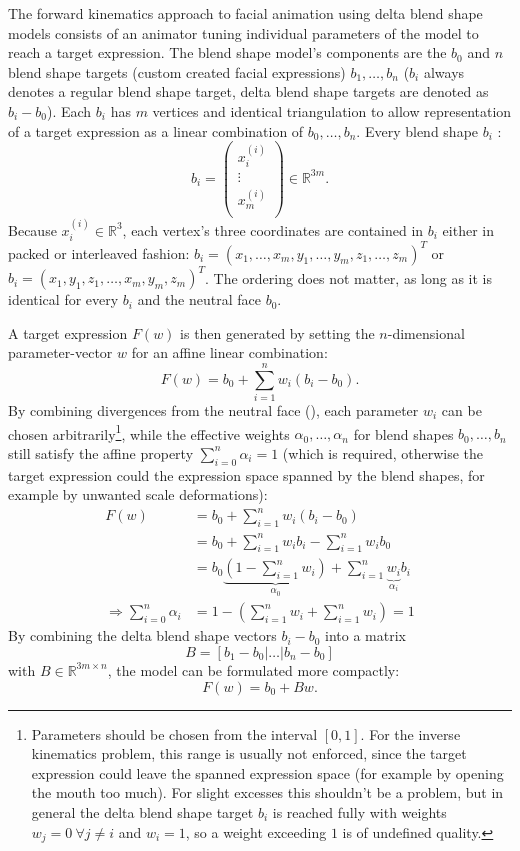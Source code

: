 The forward kinematics approach to facial animation using delta blend shape models consists of an animator tuning individual parameters of the model to reach a target expression.
The blend shape model's components are the  \(b_0\) and \(n\) blend shape targets (custom created facial expressions) \(b_1,\dots,b_n\) (\(b_i\) always denotes a regular blend shape target, delta blend shape targets are denoted as \(b_i-b_0\)).
Each \(b_i\) has \(m\) vertices and identical triangulation to allow representation of a target expression as a linear combination of \(b_0,\dots,b_n\).
Every blend shape \(b_i\) :
\[b_i=\begin{pmatrix}
  x_i^{(i)}\\
  \vdots\\
  x_m^{(i)}\\
\end{pmatrix}\in\mathbb{R}^{3m}.\]
Because \(x_i^{(i)}\in\mathbb{R}^3\),
each vertex's three coordinates are contained in \(b_i\) either in packed or interleaved fashion:
\(b_i=(x_1,\dots, x_m, y_1,\dots,y_m, z_1,\dots, z_m)^T\) or \(b_i=(x_1,y_1,z_1,\dots,x_m,y_m,z_m)^T\).
The ordering does not matter, as long as it is identical for every \(b_i\) and the neutral face \(b_0\).

A target expression \(F(w)\) is then generated by setting the \(n\)-dimensional parameter-vector \(w\) for an affine linear combination:
\[F(w)=b_0+\sum\limits_{i=1}^n w_i(b_i-b_0).\]
By combining divergences from the neutral face (),
each parameter \(w_i\) can be chosen arbitrarily\footnote{
  Parameters should be chosen from the interval \([0, 1]\).
  For the inverse kinematics problem,
  this range is usually not enforced,
  since the target expression could leave the spanned expression space (for example by opening the mouth too much).
  For slight excesses this shouldn't be a problem,
  but in general the delta blend shape target \(b_i\) is reached fully with weights \(w_j=0\ \forall j\neq i\) and \(w_i=1\),
  so a weight exceeding \(1\) is of undefined quality.
},
while the effective weights \(\alpha_0,\dots,\alpha_n\) for blend shapes \(b_0,\dots,b_n\) still satisfy the affine property \(\sum_{i=0}^n\alpha_i=1\) (which is required,
otherwise the target expression could  the expression space spanned by the blend shapes,
for example by unwanted scale deformations):
\begin{align*}
  F(w)&=b_0+\sum\limits_{i=1}^{n}w_i(b_i-b_0)\\
  &=b_0+\sum\limits_{i=1}^{n}w_i b_i-\sum\limits_{i=1}^{n}w_i b_0\\
  &=b_0\underbrace{\left(1-\sum\limits_{i=1}^{n}w_i\right)}_{\alpha_0}+\sum\limits_{i=1}^{n}\underbrace{w_i}_{\alpha_i} b_i\\
  \Rightarrow \sum\limits_{i=0}^{n}\alpha_i &= 1-\left(\sum\limits_{i=1}^{n}w_i+\sum\limits_{i=1}^{n}w_i\right)=1
\end{align*}
By combining the delta blend shape vectors \(b_i-b_0\) into a matrix
\[B=[b_1-b_0|\dots|b_n-b_0]\]
with \(B\in\mathbb{R}^{3m\times n}\), the model can be formulated more compactly:
\[F(w)=b_0+Bw.\]

